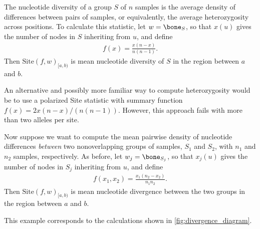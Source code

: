 \documentclass{article}
\newcommand{\site}{\mbox{Site}} %
\newcommand{\iw}{w} %
\newcommand{\nw}{x} %
\begin{document}
\begin{example} \label{ex:site_diversity}
    The nucleotide diversity of a group $S$ of $n$ samples
    is the average density of differences between pairs of samples,
    or equivalently, the average heterozygosity across positions.
    To calculate this statistic,
    let $\iw = \bone_S$,
    so that $\nw(u)$ gives the number of nodes in $S$ inheriting from $u$,
    and define
    \begin{align*}
        f(x) = \frac{x (n - x)}{n (n-1)} .
    \end{align*}
    Then $\site(f, \iw)_{[a,b)}$ is mean nucleotide diversity of $S$ in the region between $a$ and $b$.
\end{example}

An alternative and possibly more familiar way to compute heterozygosity
would be to use a polarized Site statistic with summary function $f(x) = 2
x(n-x)/\left(n(n-1)\right)$.
However, this approach fails with more than two alleles per site.

\begin{example} \label{ex:site_divergence}
    Now suppose we want to compute the mean pairwise density of nucleotide differences
    \emph{between} two nonoverlapping groups of samples, $S_1$ and $S_2$,
    with $n_1$ and $n_2$ samples, respectively.
    As before,
    let $\iw_j = \bone_{S_j}$,
    so that $\nw_{j}(u)$ gives the number of nodes in $S_j$ inheriting from $u$,
    and define
    \begin{align*}
        f(x_1, x_2) = \frac{x_1 (n_2 - x_2)}{n_1 n_2} .
    \end{align*}
    Then $\site(f, \iw)_{[a,b)}$ is mean nucleotide divergence between the two groups
    in the region between $a$ and $b$.
\end{example}

This example corresponds to the calculations shown in \autoref{fig:divergence_diagram}.
\end{document}
